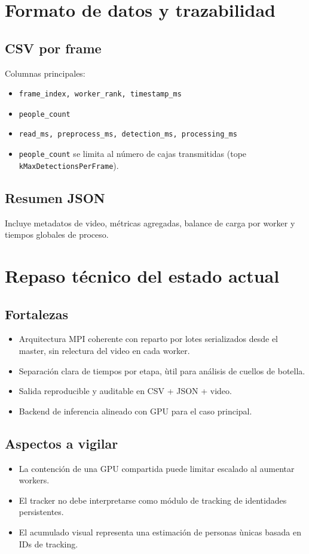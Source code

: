 \documentclass[11pt,a4paper]{article}
\begin{document}
\section{Formato de datos y trazabilidad}
\subsection{CSV por frame}
Columnas principales:
\begin{itemize}[leftmargin=*]
  \item \texttt{frame\_index, worker\_rank, timestamp\_ms}
  \item \texttt{people\_count}
  \item \texttt{read\_ms, preprocess\_ms, detection\_ms, processing\_ms}
  \item \texttt{people\_count} se limita al n\'umero de cajas transmitidas (tope \texttt{kMaxDetectionsPerFrame}).
\end{itemize}

\subsection{Resumen JSON}
Incluye metadatos de video, m\'etricas agregadas, balance de carga por worker y tiempos globales de proceso.

\section{Repaso t\'ecnico del estado actual}
\subsection{Fortalezas}
\begin{itemize}[leftmargin=*]
  \item Arquitectura MPI coherente con reparto por lotes serializados desde el master, sin relectura del video en cada worker.
  \item Separaci\'on clara de tiempos por etapa, \`util para an\'alisis de cuellos de botella.
  \item Salida reproducible y auditable en CSV + JSON + video.
  \item Backend de inferencia alineado con GPU para el caso principal.
\end{itemize}

\subsection{Aspectos a vigilar}
\begin{itemize}[leftmargin=*]
  \item La contenci\'on de una GPU compartida puede limitar escalado al aumentar workers.
  \item El tracker no debe interpretarse como m\'odulo de tracking de identidades persistentes.
  \item El acumulado visual representa una estimaci\'on de personas \`unicas basada en IDs de tracking.
\end{itemize}
\end{document}
